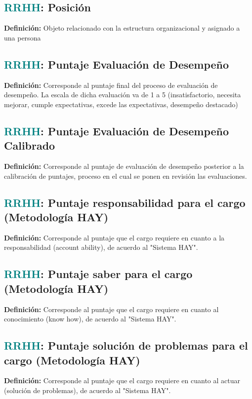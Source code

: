 \documentclass[12pt]{article}
\begin{document}
\subsection{\textcolor{teal}{RRHH}: Posición}
\textbf{Definición:} Objeto relacionado con la estructura organizacional y asignado a una persona
\subsection{\textcolor{teal}{RRHH}: Puntaje Evaluación de Desempeño}
\textbf{Definición:} Corresponde al puntaje final del proceso de evaluación de desempeño. La escala de dicha evaluación va de 1 a 5 (insatisfactorio, necesita mejorar, cumple expectativas, excede las expectativas, desempeño destacado)
\subsection{\textcolor{teal}{RRHH}: Puntaje Evaluación de Desempeño Calibrado}
\textbf{Definición:} Corresponde al puntaje de evaluación de desempeño posterior a la calibración de puntajes, proceso en el cual se ponen en revisión las evaluaciones.
\subsection{\textcolor{teal}{RRHH}: Puntaje responsabilidad para el cargo (Metodología HAY)}
\textbf{Definición:} Corresponde al puntaje que el cargo requiere en cuanto a la responsabilidad (account ability), de acuerdo al "Sistema HAY".
\subsection{\textcolor{teal}{RRHH}: Puntaje saber para el cargo (Metodología HAY)}
\textbf{Definición:} Corresponde al puntaje que el cargo requiere en cuanto al conocimiento (know how), de acuerdo al "Sistema HAY".
\subsection{\textcolor{teal}{RRHH}: Puntaje solución de problemas para el cargo (Metodología HAY)}
\textbf{Definición:} Corresponde al puntaje que el cargo requiere en cuanto al actuar (solución de problemas), de acuerdo al "Sistema HAY".
\end{document}
